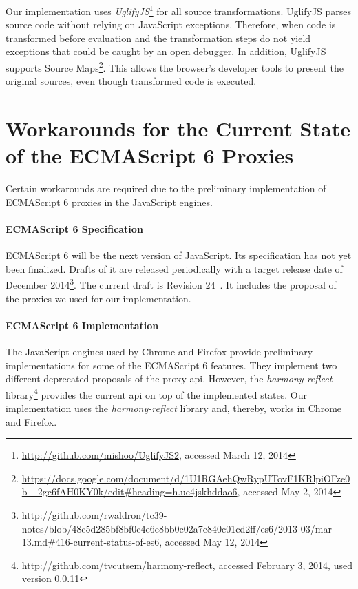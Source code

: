 Our implementation uses \emph{UglifyJS}\footnote{\url{http://github.com/mishoo/UglifyJS2}, accessed March 12, 2014} for all source transformations.
UglifyJS parses source code without relying on JavaScript exceptions.
Therefore, when code is transformed before evaluation and the transformation steps do not yield exceptions that could be caught by an open debugger.
In addition, UglifyJS supports Source Maps\footnote{\url{https://docs.google.com/document/d/1U1RGAehQwRypUTovF1KRlpiOFze0b-_2gc6fAH0KY0k/edit\#heading=h.ue4jskhddao6}, accessed May 2, 2014}.
This allows the browser's developer tools to present the original sources, even though transformed code is executed.





\section{Workarounds for the Current State of the ECMAScript 6 Proxies} \label{sec:IMPLEMENTATION:4}

Certain workarounds are required due to the preliminary implementation of ECMAScript 6 proxies in the JavaScript engines.

\paragraph{ECMAScript 6 Specification}
ECMAScript 6 will be the next version of JavaScript.
Its specification has not yet been finalized.
Drafts of it are released periodically with a target release date of December 2014\footnote{http://github.com/rwaldron/tc39-notes/blob/48c5d285bf8bf0c4e6e8bb0c02a7c840c01cd2ff/es6/2013-03/mar-13.md\#416-current-status-of-es6, accessed May 12, 2014}.
The current draft is Revision 24~\cite{Ecma2014ES6}.
It includes the proposal of the proxies we used for our implementation.

\paragraph{ECMAScript 6 Implementation}
The JavaScript engines used by Chrome and Firefox provide preliminary implementations for some of the ECMAScript 6 features.
They implement two different deprecated proposals of the proxy \ac{api}.
However, the \emph{harmony-reflect} library\footnote{\url{http://github.com/tvcutsem/harmony-reflect}, accessed February 3, 2014, used version 0.0.11} provides the current \ac{api} on top of the implemented states.
Our implementation uses the \emph{harmony-reflect} library and, thereby, works in Chrome and Firefox.

